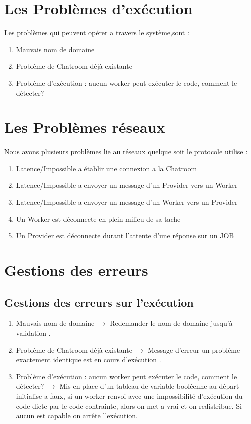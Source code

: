 \documentclass[11pt]{report}
\begin{document}
\section{Les Problèmes d’exécution}
Les problèmes qui peuvent opérer a travers le système,sont : 
\begin{enumerate}
\item Mauvais nom de domaine 
\item Problème de Chatroom déjà existante
\item Problème d’exécution : aucun worker peut exécuter le code, comment le détecter?

\end{enumerate}  

\newpage
\section{Les Problèmes réseaux}
Nous avons plusieurs problèmes lie au réseaux quelque soit le protocole utilise :
\begin{enumerate}
\item Latence/Impossible a établir une  connexion a la Chatroom
\item Latence/Impossible a envoyer un  message d'un Provider vers un Worker
\item Latence/Impossible a envoyer un  message d'un Worker vers un Provider
\item Un Worker est déconnecte en plein milieu de sa tache
\item Un Provider est déconnecte durant l'attente d'une réponse sur un JOB
\end{enumerate}
\newpage
\section{Gestions des erreurs}

\subsection{Gestions des erreurs sur l\textquoteright exécution}
\begin{enumerate}
\item Mauvais nom de domaine $ \rightarrow $ Redemander le nom de domaine jusqu’à validation .
\item Problème de Chatroom déjà existante $\rightarrow$ Message d'erreur un problème exactement identique est en cours d’exécution .
\item Problème d’exécution : aucun worker peut exécuter le code, comment le détecter? $\rightarrow$ Mis en place d'un tableau de variable booléenne au départ initialise a faux, si un worker renvoi avec une impossibilité d\textquoteright exécution du code dicte par le code contrainte, alors on met a vrai et on redistribue. Si aucun est capable on arrête l\textquoteright exécution.
\end{enumerate}  
\end{document}
